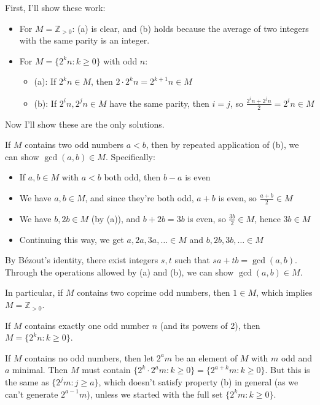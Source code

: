 \documentclass[12pt,a4paper]{article}
\theoremstyle{definition}
\begin{document}
    First, I'll show these work:
    \begin{itemize}
        \item For $M = \mathbb{Z}_{>0}$: (a) is clear, and (b) holds because the average of two integers with the same parity is an integer.
        \item For $M = \{2^k n : k \geq 0\}$ with odd $n$:
        \begin{itemize}
            \item (a): If $2^k n \in M$, then $2 \cdot 2^k n = 2^{k+1} n \in M$ \checkmark
            \item (b): If $2^i n, 2^j n \in M$ have the same parity, then $i = j$, so $\frac{2^i n + 2^j n}{2} = 2^i n \in M$ \checkmark
        \end{itemize}
    \end{itemize}

    Now I'll show these are the only solutions.

    If $M$ contains two odd numbers $a < b$, then by repeated application of (b), we can show $\gcd(a,b) \in M$. Specifically:
    \begin{itemize}
        \item If $a, b \in M$ with $a < b$ both odd, then $b - a$ is even
        \item We have $a, b \in M$, and since they're both odd, $a + b$ is even, so $\frac{a+b}{2} \in M$
        \item We have $b, 2b \in M$ (by (a)), and $b + 2b = 3b$ is even, so $\frac{3b}{2} \in M$, hence $3b \in M$
        \item Continuing this way, we get $a, 2a, 3a, \ldots \in M$ and $b, 2b, 3b, \ldots \in M$
    \end{itemize}

    By Bézout's identity, there exist integers $s, t$ such that $sa + tb = \gcd(a,b)$. Through the operations allowed by (a) and (b), we can show $\gcd(a,b) \in M$.

    In particular, if $M$ contains two coprime odd numbers, then $1 \in M$, which implies $M = \mathbb{Z}_{>0}$.

    If $M$ contains exactly one odd number $n$ (and its powers of 2), then $M = \{2^k n : k \geq 0\}$.

    If $M$ contains no odd numbers, then let $2^a m$ be an element of $M$ with $m$ odd and $a$ minimal. Then $M$ must contain $\{2^k \cdot 2^a m : k \geq 0\} = \{2^{a+k} m : k \geq 0\}$. But this is the same as $\{2^j m : j \geq a\}$, which doesn't satisfy property (b) in general (as we can't generate $2^{a-1} m$), unless we started with the full set $\{2^k m : k \geq 0\}$.
\end{document}
